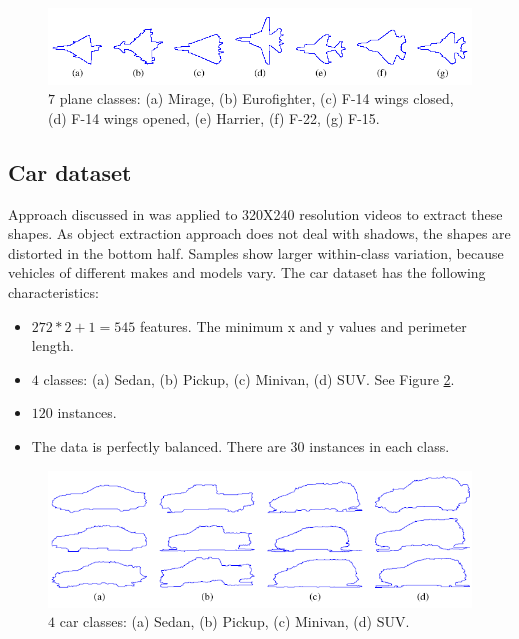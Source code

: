 \documentclass{article} %
\begin{document}
\begin{figure}[ht]
    \centering
    \includegraphics[width=\linewidth]{shape_plane.png}
    \caption{$7$ plane classes: (a) Mirage, (b) Eurofighter, (c) F-14 wings closed, (d) F-14 wings opened, (e) Harrier, (f) F-22, (g) F-15.}
    \label{fig:plane}
\end{figure}

\subsection{Car dataset}

Approach discussed in \cite{Thakoor:2005-Sept} was applied to 320X240 resolution videos to extract these shapes. As object extraction approach does not deal with shadows, the shapes are distorted in the bottom half. Samples show larger within-class variation, because vehicles of different makes and models vary.
The car dataset has the following characteristics:

\begin{itemize}
    \item $272*2+1=545$ features. The minimum x and y values and perimeter length.
    \item $4$ classes: (a) Sedan, (b) Pickup, (c) Minivan, (d) SUV. See Figure \ref{fig:car}.
    \item $120$ instances. 
    \item The data is perfectly balanced. There are 30 instances in each class.
\end{itemize}

\begin{figure}[ht]
    \centering
    \includegraphics[width=\linewidth]{shape_car.png}
    \caption{$4$ car classes: (a) Sedan, (b) Pickup, (c) Minivan, (d) SUV.}
    \label{fig:car}
\end{figure}
\end{document}
